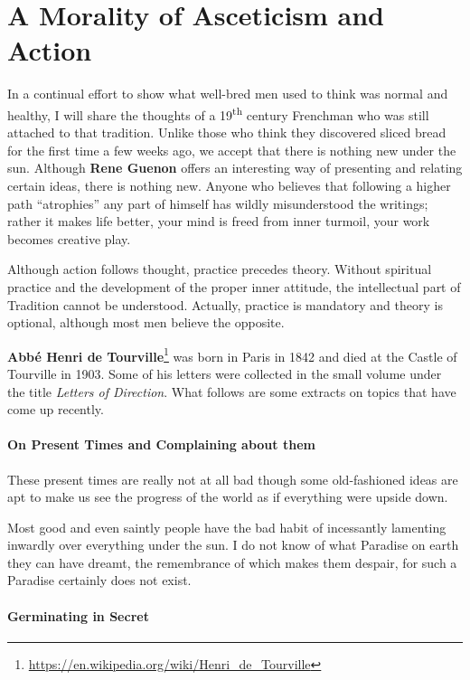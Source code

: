 \section{A Morality of Asceticism and Action}

In a continual effort to show what well-bred men used to think was normal and healthy, I will share the thoughts of a 19\textsuperscript{th} century Frenchman who was still attached to that tradition. Unlike those who think they discovered sliced bread for the first time a few weeks ago, we accept that there is nothing new under the sun. Although \textbf{Rene Guenon} offers an interesting way of presenting and relating certain ideas, there is nothing new. Anyone who believes that following a higher path ``atrophies'' any part of himself has wildly misunderstood the writings; rather it makes life better, your mind is freed from inner turmoil, your work becomes creative play.

Although action follows thought, practice precedes theory. Without spiritual practice and the development of the proper inner attitude, the intellectual part of Tradition cannot be understood. Actually, practice is mandatory and theory is optional, although most men believe the opposite.

\textbf{Abbé Henri de Tourville}\footnote{\url{https://en.wikipedia.org/wiki/Henri\_de\_Tourville}} was born in Paris in 1842 and died at the Castle of Tourville in 1903. Some of his letters were collected in the small volume under the title \textit{Letters of Direction}. What follows are some extracts on topics that have come up recently.

\paragraph{On Present Times and Complaining about them}


\begin{quotationx}
These present times are really not at all bad though some old-fashioned ideas are apt to make us see the progress of the world as if everything were upside down.

Most good and even saintly people have the bad habit of incessantly lamenting inwardly over everything under the sun. I do not know of what Paradise on earth they can have dreamt, the remembrance of which makes them despair, for such a Paradise certainly does not exist.
\end{quotationx}


\paragraph{Germinating in Secret}


